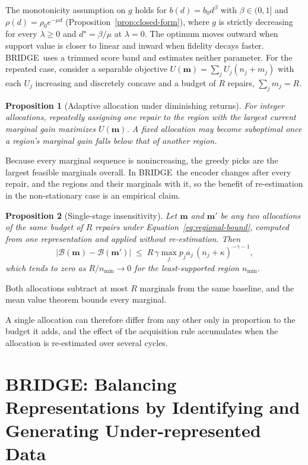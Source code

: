 \documentclass{article}
\newcommand{\method}{BRIDGE}
\newtheorem{proposition}{Proposition}
\begin{document}
The monotonicity assumption on $g$ holds for $b(d)=b_0d^{\beta}$ with $\beta\in(0,1]$ and $\rho(d)=\rho_0e^{-\mu d}$ (Proposition~\ref{prop:closed-form}), where $g$ is strictly decreasing for every $\lambda\geq0$ and $d^{\star}=\beta/\mu$ at $\lambda=0$. The optimum moves outward when support value is closer to linear and inward when fidelity decays faster. \method\ uses a trimmed score band and estimates neither parameter. For the repeated case, consider a separable objective $U(\mathbf m)=\sum_jU_j(n_j+m_j)$ with each $U_j$ increasing and discretely concave and a budget of $R$ repairs, $\sum_jm_j=R$.

\begin{proposition}[Adaptive allocation under diminishing returns]
\label{prop:adaptive}
For integer allocations, repeatedly assigning one repair to the region with the largest current marginal gain maximizes $U(\mathbf m)$. A fixed allocation may become suboptimal once a region's marginal gain falls below that of another region.
\end{proposition}
Because every marginal sequence is nonincreasing, the greedy picks are the largest feasible marginals overall. In \method\ the encoder changes after every repair, and the regions and their marginals with it, so the benefit of re-estimation in the non-stationary case is an empirical claim.

\begin{proposition}[Single-stage insensitivity]
\label{prop:one-stage}
Let $\mathbf m$ and $\mathbf m'$ be any two allocations of the same budget of $R$ repairs under Equation~\ref{eq:regional-bound}, computed from one representation and applied without re-estimation. Then
\begin{equation}
\bigl|\mathcal B(\mathbf m)-\mathcal B(\mathbf m')\bigr|\;\leq\;R\,\gamma\max_j p_ja_j\,(n_j+\kappa)^{-\gamma-1},
\end{equation}
which tends to zero as $R/n_{\min}\to0$ for the least-supported region $n_{\min}$.
\end{proposition}
Both allocations subtract at most $R$ marginals from the same baseline, and the mean value theorem bounds every marginal.

A single allocation can therefore differ from any other only in proportion to the budget it adds, and the effect of the acquisition rule accumulates when the allocation is re-estimated over several cycles.

\section{BRIDGE: Balancing Representations by Identifying and Generating Under-represented Data}
\label{sec:method}
\end{document}
